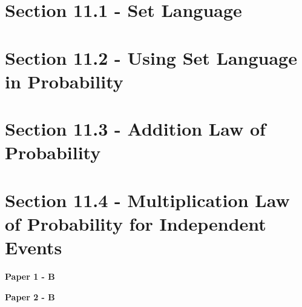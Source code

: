 \documentclass[12pt, a4paper]{article}
\begin{document}
\section*{Section 11.1 - Set Language \NF}\label{section:5-11-1}





\section*{Section 11.2 - Using Set Language in Probability \NF}\label{section:5-11-2}





\section*{Section 11.3 - Addition Law of Probability \NF}\label{section:5-11-3}





\section*{Section 11.4 - Multiplication Law of Probability for Independent Events \NF}\label{section:5-11-4}

\textbf{Paper 1 - B}
\begin{enumx}[label=\arabic*.,start=1]
\item {}\label{DSE2013-CoreP1-Q16} 
\item {}\label{DSE2015-CoreP1-Q16} 
\end{enumx}
\textbf{Paper 2 - B}
\begin{enumx}[label=\arabic*.,start=3]
\item {}\label{DSE2012S-CoreP2-Q43} 
\item {}\label{DSE2015-CoreP2-Q44} 
\item {}\label{DSE2017-CoreP2-Q43} 
\item {}\label{DSE2019-CoreP2-Q42} 
\item {}\label{DSE2021-CoreP2-Q43} 
\end{enumx}
\end{document}

